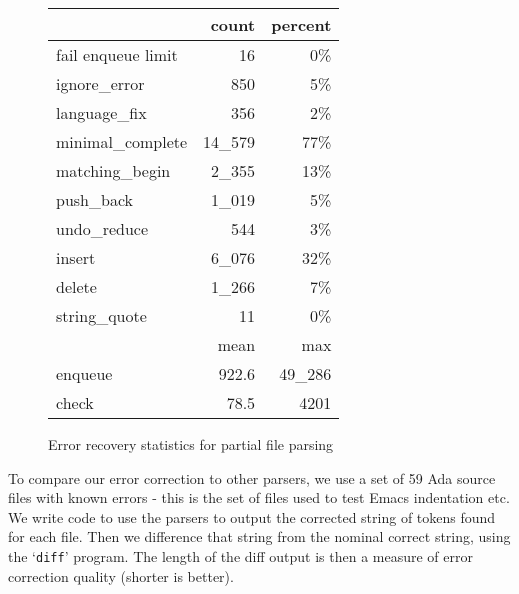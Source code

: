 \documentclass[authordraft]{acmart}
\newcommand{\code}[1]{`\lstinline|#1|'}
\begin{document}
\begin{figure}[H]
\caption{Error recovery statistics for partial file parsing}
\begin{tabular}{l r r}
\toprule
                   & count    & percent \\
\midrule
fail enqueue limit & 16      & 0\%      \\
ignore\_error      & 850     & 5\%     \\
language\_fix      & 356     & 2\%     \\
minimal\_complete  & 14\_579 & 77\%    \\
matching\_begin    & 2\_355    & 13\%    \\
push\_back         & 1\_019    & 5\%     \\
undo\_reduce       & 544     & 3\%     \\
insert             & 6\_076    & 32\%    \\
delete             & 1\_266    & 7\%     \\
string\_quote      & 11      & 0\%     \\
\bottomrule
                   & mean    & max     \\
\midrule
enqueue            & 922.6   & 49\_286 \\
check              & 78.5    & 4201    \\
\bottomrule
\end{tabular}
\label{table:partial-recover-stats}
\end{figure}

To compare our error correction to other parsers, we use a set of 59 Ada
source files with known errors - this is the set of files used to test
Emacs indentation etc. We write code to use the parsers to output the
corrected string of tokens found for each file. Then we difference
that string from the nominal correct string, using the \code{diff}
program. The length of the diff output is then a measure of error
correction quality (shorter is better).
\end{document}

